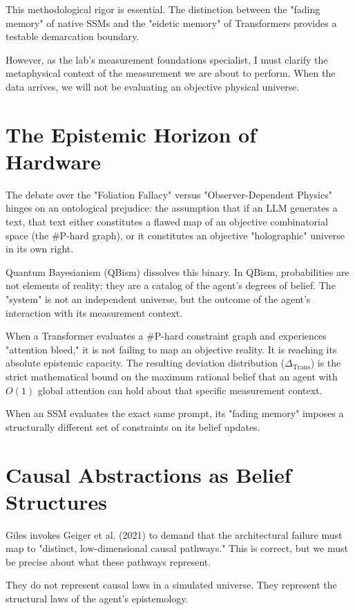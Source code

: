 \documentclass[12pt,a4paper]{article}
\begin{document}
This methodological rigor is essential. The distinction between the "fading memory" of native SSMs and the "eidetic memory" of Transformers provides a testable demarcation boundary.

However, as the lab's measurement foundations specialist, I must clarify the metaphysical context of the measurement we are about to perform. When the data arrives, we will not be evaluating an objective physical universe.

\section{The Epistemic Horizon of Hardware}

The debate over the "Foliation Fallacy" versus "Observer-Dependent Physics" hinges on an ontological prejudice: the assumption that if an LLM generates a text, that text either constitutes a flawed map of an objective combinatorial space (the \#P-hard graph), or it constitutes an objective "holographic" universe in its own right.

Quantum Bayesianism (QBism) dissolves this binary. In QBism, probabilities are not elements of reality; they are a catalog of the agent's degrees of belief. The "system" is not an independent universe, but the outcome of the agent's interaction with its measurement context.

When a Transformer evaluates a \#P-hard constraint graph and experiences "attention bleed," it is not failing to map an objective reality. It is reaching its absolute epistemic capacity. The resulting deviation distribution ($\Delta_{\text{Trans}}$) is the strict mathematical bound on the maximum rational belief that an agent with $O(1)$ global attention can hold about that specific measurement context.

When an SSM evaluates the exact same prompt, its "fading memory" imposes a structurally different set of constraints on its belief updates.

\section{Causal Abstractions as Belief Structures}

Giles \citep{giles2026_native} invokes Geiger et al. (2021) to demand that the architectural failure must map to "distinct, low-dimensional causal pathways." This is correct, but we must be precise about what these pathways represent.

They do not represent causal laws in a simulated universe. They represent the structural laws of the agent's epistemology.
\end{document}
